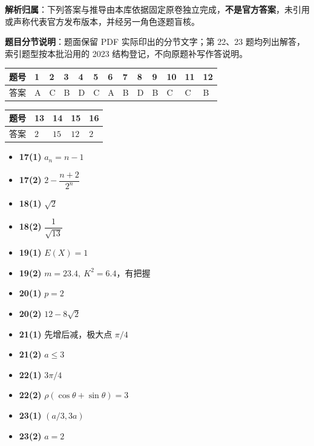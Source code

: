 
\begin{gknotice}
\textbf{解析归属}：下列答案与推导由本库依据固定原卷独立完成，\textbf{不是官方答案}，未引用或声称代表官方发布版本，并经另一角色逐题盲核。

\textbf{题目分节说明}：题面保留 PDF 实际印出的分节文字；第 22、23 题均列出解答，索引题型按本批沿用的 2023 结构登记，不向原题补写作答说明。
\end{gknotice}


\begin{center}
\begingroup\setlength{\tabcolsep}{4pt}
\begin{tabular}{lllllllllllll}
\toprule
题号 & 1 & 2 & 3 & 4 & 5 & 6 & 7 & 8 & 9 & 10 & 11 & 12 \\
\midrule
答案 & A & C & B & D & C & A & B & D & B & C & C & B \\
\bottomrule
\end{tabular}
\endgroup
\end{center}

\begin{center}
\begin{tabular}{lllll}
\toprule
题号 & 13 & 14 & 15 & 16 \\
\midrule
答案 & $2$ & $15$ & $12$ & $2$ \\
\bottomrule
\end{tabular}
\end{center}

\begin{itemize}
\item \textbf{17(1)} $a_n=n-1$
\item \textbf{17(2)} $2-\dfrac{n+2}{2^n}$
\item \textbf{18(1)} $\sqrt2$
\item \textbf{18(2)} $\dfrac1{\sqrt{13}}$
\item \textbf{19(1)} $E(X)=1$
\item \textbf{19(2)} $m=23.4,\ K^2=6.4$，有把握
\item \textbf{20(1)} $p=2$
\item \textbf{20(2)} $12-8\sqrt2$
\item \textbf{21(1)} 先增后减，极大点 $\pi/4$
\item \textbf{21(2)} $a\leqslant3$
\item \textbf{22(1)} $3\pi/4$
\item \textbf{22(2)} $\rho(\cos\theta+\sin\theta)=3$
\item \textbf{23(1)} $(a/3,3a)$
\item \textbf{23(2)} $a=2$
\end{itemize}

